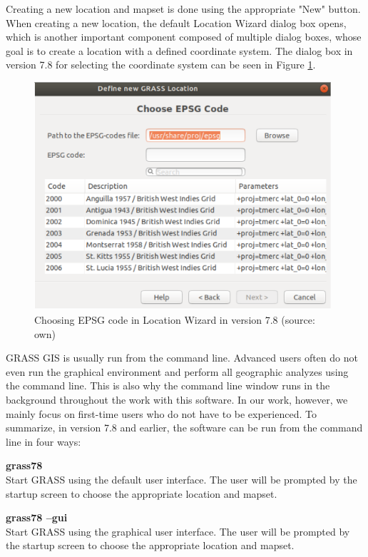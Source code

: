 \documentclass[a4paper,10pt,twoside]{article}
\begin{document}
Creating a new location and mapset is done using the appropriate "New" button. When creating a new location, the default Location Wizard dialog box opens, which is another important component composed of multiple dialog boxes, whose goal is to create a location with a defined coordinate system. The dialog box in version 7.8 for selecting the coordinate system can be seen in Figure \ref{fig:loc_wizard_sour_pred}.

\vspace{0.3cm}
\begin{figure}[hbt!]
\begin{center}
\includegraphics[width=11cm]{pictures/loc_wizard_sour_pred.png} 
\caption[Choosing EPSG code in Location Wizard in version 7.8]{Choosing EPSG code in Location Wizard in version 7.8 (source: own)}
\label{fig:loc_wizard_sour_pred}
\end{center}
\end{figure}

\noindent GRASS GIS is usually run from the command line. Advanced users often do not even run the graphical environment and perform all geographic analyzes using the command line. This is also why the command line window runs in the background throughout the work with this software. In our work, however, we mainly focus on first-time users who do not have to be experienced. To summarize, in version 7.8 and earlier, the software can be run from the command line in four ways:

\noindent \textbf{grass78} \\
\noindent Start GRASS using the default user interface. The user will be prompted by the startup screen to choose the appropriate location and mapset.

\noindent \textbf{grass78 --gui}\\
\noindent Start GRASS using the graphical user interface. The user will be prompted by the startup screen to choose the appropriate location and mapset.
\end{document}
